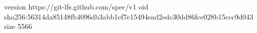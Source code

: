 version https://git-lfs.github.com/spec/v1
oid sha256:56314da85148fb4096db3abb1ef7e15494ead2edc30dd86fce028b15ccc9d043
size 5566
